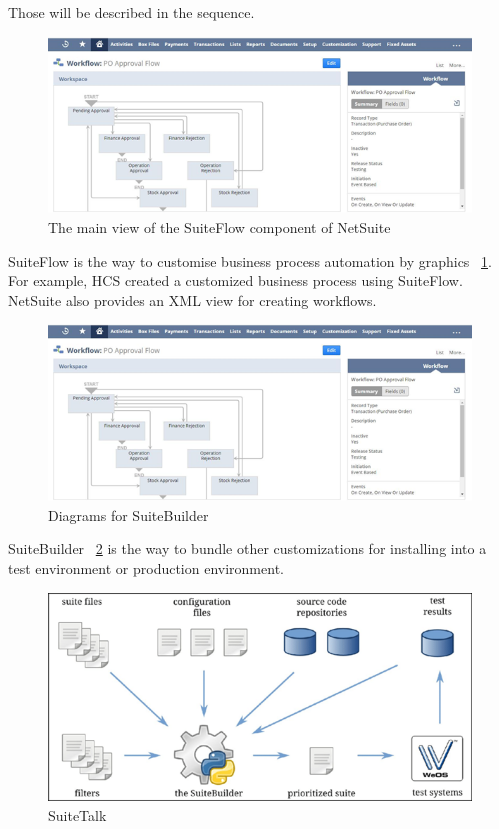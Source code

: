 Those will be described in the sequence. 

\begin{figure}[!htb]
    \centering 
    \includegraphics[scale=0.7]{resource/suiteFlow.png}
    \caption{The main view of the SuiteFlow component of NetSuite}
    \label{figure:suiteFlow}
\end{figure}

SuiteFlow is the way to customise business process automation by graphics ~\ref{figure:suiteFlow}. For example, HCS created a customized business process using SuiteFlow. NetSuite also provides an XML view for creating workflows.

\begin{figure}[!htb]
    \centering 
    \includegraphics[scale=0.7]{resource/suiteFlow.png}
    \caption{Diagrams for SuiteBuilder}
    \label{figure:suiteBuilder}
\end{figure}


SuiteBuilder ~\ref{figure:suiteBuilder} is the way to bundle other customizations for installing into a test environment or production environment.

\begin{figure}[!htb]
    \centering 
    \includegraphics[scale=0.7]{resource/suiteTalk.png}
    \caption{SuiteTalk}
    \label{figure:suiteTalk}
\end{figure}

